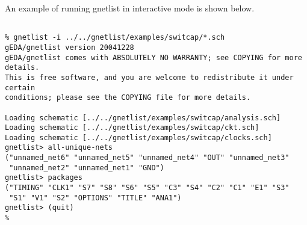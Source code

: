 \documentclass{article}
\begin{document}
An example of running gnetlist in interactive mode is shown below.

\begin{verbatim}

% gnetlist -i ../../gnetlist/examples/switcap/*.sch
gEDA/gnetlist version 20041228
gEDA/gnetlist comes with ABSOLUTELY NO WARRANTY; see COPYING for more details.
This is free software, and you are welcome to redistribute it under certain
conditions; please see the COPYING file for more details.

Loading schematic [../../gnetlist/examples/switcap/analysis.sch]
Loading schematic [../../gnetlist/examples/switcap/ckt.sch]
Loading schematic [../../gnetlist/examples/switcap/clocks.sch]
gnetlist> all-unique-nets
("unnamed_net6" "unnamed_net5" "unnamed_net4" "OUT" "unnamed_net3"
 "unnamed_net2" "unnamed_net1" "GND")
gnetlist> packages
("TIMING" "CLK1" "S7" "S8" "S6" "S5" "C3" "S4" "C2" "C1" "E1" "S3"
 "S1" "V1" "S2" "OPTIONS" "TITLE" "ANA1")
gnetlist> (quit)
%

\end{verbatim}
\end{document}
